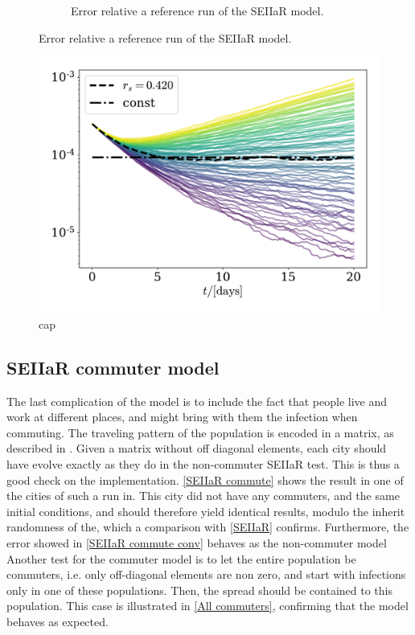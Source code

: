 \documentclass{article}
\begin{document}
\begin{figure}[H]
\begin{subfigure}{.49\textwidth}
            \caption{Error relative a reference run of the SEIIaR model.}
            \label{SEIIaR conv}
        \end{subfigure}
    \end{figure}

    \begin{figure}[H]
        \centering
        \includegraphics[width=.7\textwidth]{../plots/2C/isolation.pdf}
        \caption{cap}
        \label{isolation}
    \end{figure}


    \subsection*{SEIIaR commuter model}
    The last complication of the model is to include the fact that people live and work at different places, and might bring with them the infection when commuting. 
    The traveling pattern of the population is encoded in a matrix, as described in \cite{exam}.
    Given a matrix without off diagonal elements, each city should have evolve exactly as they do in the non-commuter SEIIaR test.
    This is thus a good check on the implementation.
    \autoref{SEIIaR commute} shows the result in one of the cities of such a run in.
    This city did not have any commuters, and the same initial conditions, and should therefore yield identical results, modulo the inherit randomness of the, which a comparison with \autoref{SEIIaR} confirms.
    Furthermore, the error showed in \autoref{SEIIaR commute conv} behaves as the non-commuter model
    Another test for the commuter model is to let the entire population be commuters, i.e. only off-diagonal elements are non zero, and start with infections only in one of these populations.
    Then, the spread should be contained to this population.
    This case is illustrated in \autoref{All commuters}, confirming that the model behaves as expected.
\end{document}
